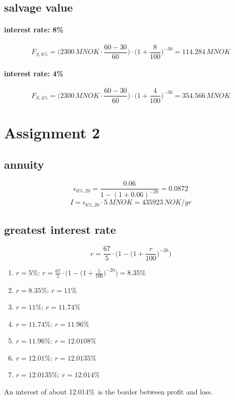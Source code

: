 \documentclass{article}
\begin{document}
\subsection{salvage value}
\paragraph{interest rate: 8\%\\}
$$F_{S,8\%}=\bigg(2300\,MNOK\cdot\frac{60-30}{60}\bigg)\cdot\bigg(1+\frac{8}{100}\bigg)^{-30}=114.284\,MNOK$$
\paragraph{interest rate: 4\%\\}
$$F_{S,4\%}=\bigg(2300\,MNOK\cdot\frac{60-30}{60}\bigg)\cdot\bigg(1+\frac{4}{100}\bigg)^{-30}=354.566\,MNOK$$
\newpage
\section{Assignment 2}
\subsection{annuity}
$$\epsilon_{6\%,20}=\frac{0.06}{1-(1+0.06)^{-20}}=0.0872$$
$$I=\epsilon_{6\%,20}\cdot 5\,MNOK=435923\,NOK/yr$$
\subsection{greatest interest rate}
$$r=\frac{67}{5}\cdot\bigg(1-\big(1+\frac{r}{100}\big)^{-20}\bigg)$$
\begin{enumerate}
\item $r=5\%$: $r=\frac{67}{5}\cdot\bigg(1-\big(1+\frac{5}{100}\big)^{-20}\bigg)=8.35\%$
\item $r=8.35\%$: $r=11\%$
\item $r=11\%$: $r=11.74\%$
\item $r=11.74\%$: $r=11.96\%$
\item $r=11.96\%$: $r=12.0108\%$
\item $r=12.01\%$: $r=12.0135\%$
\item $r=12.0135\%$: $r=12.014\%$
\end{enumerate}
An interest of about 12.014\%\, is the border between profit and loss.
\end{document}
